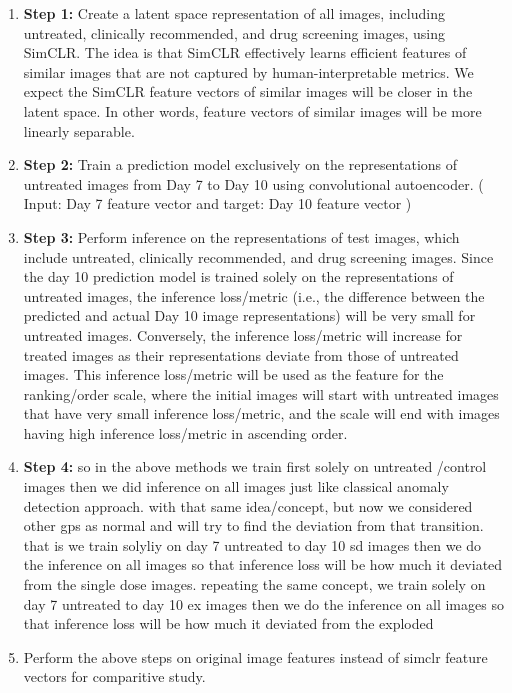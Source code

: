 \begin{enumerate}
    \item \textbf{Step 1:} Create a latent space representation of all images, including untreated, clinically recommended, 
    and drug screening images, using SimCLR. 
    The idea is that SimCLR effectively learns efficient features of similar images that are not captured by 
    human-interpretable metrics. We expect the SimCLR feature vectors of similar images will be closer in the latent space. 
    In other words, feature vectors of similar images will be more linearly separable.
  
  \item \textbf{Step 2:} Train a prediction model exclusively on the representations of 
  untreated images from Day 7 to Day 10 using convolutional autoencoder. ( Input: Day 7 feature vector and target: Day 10 feature vector )

  
  \item \textbf{Step 3:} Perform inference on the representations of test images, which include untreated, clinically recommended, and drug screening images.
  Since the day 10 prediction model is trained solely on the representations of untreated images, the inference loss/metric 
  (i.e., the difference between the predicted and actual Day 10 image representations) will be very small for untreated images.
   Conversely, the inference loss/metric will increase for treated images as their representations deviate from those of untreated images.
  This inference loss/metric will be used as the feature for the ranking/order scale, where the initial images will start 
  with untreated images that have very small inference loss/metric, and the scale will end with images having high inference loss/metric in ascending order. 
  
  \item \textbf{Step 4:} so in the above methods we train first solely on untreated /control images then we did inference on all images just like classical anomaly detection approach. 
  with that same idea/concept, but now we considered other gps as normal and will try to find the deviation from that transition. that is
  we train solyliy on day 7 untreated to day 10 sd images then we do the inference on all images so that inference loss will be how much it deviated from the single dose 
  images. repeating the same concept, we train solely on day 7 untreated to day 10 ex images then we do the inference on all images so that inference loss will be
   how much it deviated from the exploded
  \item Perform the above steps on original image features instead of simclr feature vectors for comparitive study.
\end{enumerate}


